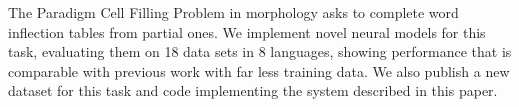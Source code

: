 The Paradigm Cell Filling Problem in morphology asks to complete word inflection tables from partial ones. We implement novel neural models for this task, evaluating them on 18 data sets in 8 languages, showing performance that is comparable with previous work with far less training data.  We also publish a new dataset for this task and code implementing the system described in this paper.
